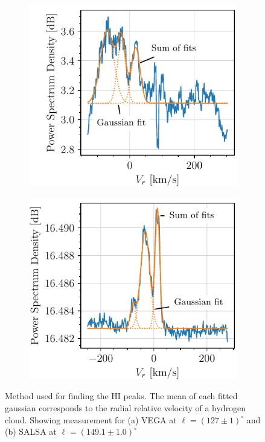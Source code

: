 \begin{figure}[htbp]
    \centering
    \begin{subfigure}{0.49\textwidth}
        \includegraphics{figures/VEGA2_fit_l_127.pdf}
        \caption{}
        \label{fig:fit_VEGA}
    \end{subfigure}
    \begin{subfigure}{0.49\textwidth}
        \includegraphics{figures/SALSA_fit_l_124.9.pdf}
        \caption{}
        \label{fig:fit_SALSA}
    \end{subfigure}
    \caption{Method used for finding the HI peaks. The mean of each fitted gaussian corresponds to the radial relative velocity of a hydrogen cloud. Showing measurement for (a) VEGA at $\ell = (127 \pm 1)^\circ$ and (b) SALSA at $\ell = (149.1 \pm 1.0)^\circ$}
    \label{fig:look_at_these_fits_please}
\end{figure}